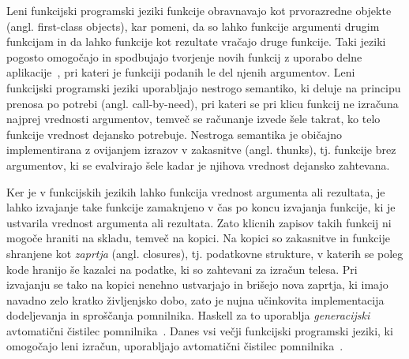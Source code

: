 \documentclass[a4paper, 12pt]{article}
\begin{document}
Leni funkcijski programski jeziki funkcije obravnavajo kot prvorazredne objekte (angl. first-class objects), kar pomeni, da so lahko funkcije argumenti drugim funkcijam in da lahko funkcije kot rezultate vračajo druge funkcije. Taki jeziki pogosto omogočajo in spodbujajo tvorjenje novih funkcij z uporabo delne aplikacije~\cite{10.1145/72551.72554}, pri kateri je funkciji podanih le del njenih argumentov. Leni funkcijski programski jeziki uporabljajo nestrogo semantiko, ki deluje na principu prenosa po potrebi (angl. call-by-need), pri kateri se pri klicu funkcij ne izračuna najprej vrednosti argumentov, temveč se računanje izvede šele takrat, ko telo funkcije vrednost dejansko potrebuje. Nestroga semantika je običajno implementirana z ovijanjem izrazov v zakasnitve (angl. thunks), tj. funkcije brez argumentov, ki se evalvirajo šele kadar je njihova vrednost dejansko zahtevana.


Ker je v funkcijskih jezikih lahko funkcija vrednost argumenta ali rezultata, je lahko izvajanje take funkcije zamaknjeno v čas po koncu izvajanja funkcije, ki je ustvarila vrednost argumenta ali rezultata. Zato klicnih zapisov takih funkcij ni mogoče hraniti na skladu, temveč na kopici. Na kopici so zakasnitve in funkcije shranjene kot \textit{zaprtja} (angl. closures), tj. podatkovne strukture, v katerih se poleg kode hranijo še kazalci na podatke, ki so zahtevani za izračun telesa. Pri izvajanju se tako na kopici nenehno ustvarjajo in brišejo nova zaprtja, ki imajo navadno zelo kratko življenjsko dobo, zato je nujna učinkovita implementacija dodeljevanja in sproščanja pomnilnika. Haskell za to uporablja \textit{generacijski} avtomatični čistilec pomnilnika~\cite{sansom1993generational, GHC}. Danes vsi večji funkcijski programski jeziki, ki omogočajo leni izračun, uporabljajo avtomatični čistilec pomnilnika~\cite{turner1985miranda, czaplicki2012elm, brus1987clean, syme2017the, sperber2009revised6}.
\end{document}
